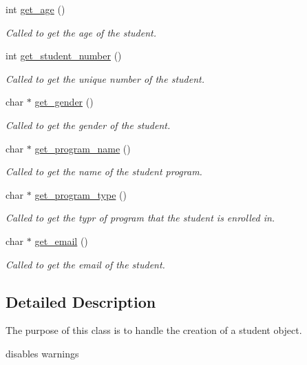 \begin{DoxyCompactItemize}
int \hyperlink{classstudent_a2703167a352fa1846de51258186bf83f}{get\-\_\-age} ()
\begin{DoxyCompactList}\small\item\em Called to get the age of the student. \end{DoxyCompactList}\item 
int \hyperlink{classstudent_ae47e9ad0cb36dd9bbabcbc25096e4738}{get\-\_\-student\-\_\-number} ()
\begin{DoxyCompactList}\small\item\em Called to get the unique number of the student. \end{DoxyCompactList}\item 
char $\ast$ \hyperlink{classstudent_a5778ee09d014874c15005858d6153914}{get\-\_\-gender} ()
\begin{DoxyCompactList}\small\item\em Called to get the gender of the student. \end{DoxyCompactList}\item 
char $\ast$ \hyperlink{classstudent_a723151d4431739db7b6764e1341b61ee}{get\-\_\-program\-\_\-name} ()
\begin{DoxyCompactList}\small\item\em Called to get the name of the student program. \end{DoxyCompactList}\item 
char $\ast$ \hyperlink{classstudent_a5b7d062bbd6735aa5fb2ddd54dbab2bb}{get\-\_\-program\-\_\-type} ()
\begin{DoxyCompactList}\small\item\em Called to get the typr of program that the student is enrolled in. \end{DoxyCompactList}\item 
char $\ast$ \hyperlink{classstudent_a35b224465ae36ac36c0d7b62d729b606}{get\-\_\-email} ()
\begin{DoxyCompactList}\small\item\em Called to get the email of the student. \end{DoxyCompactList}\end{DoxyCompactItemize}


\subsection{Detailed Description}
The purpose of this class is to handle the creation of a student object. 

disables warnings

